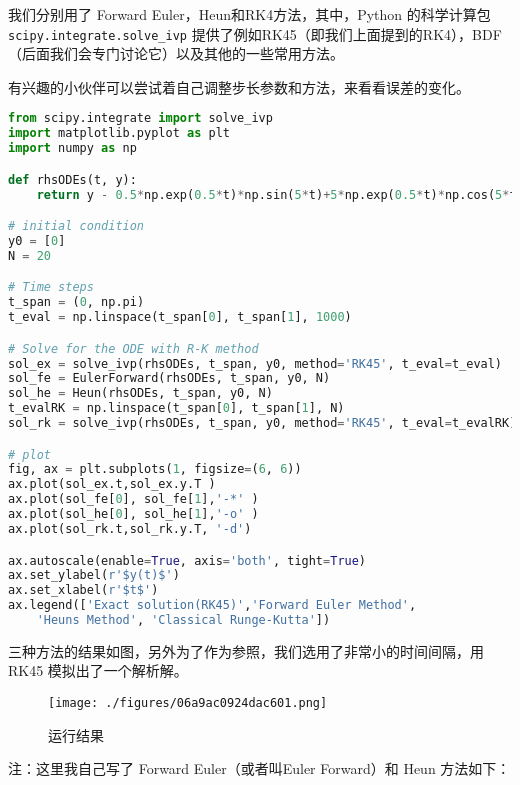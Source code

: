 我们分别用了 Forward Euler，Heun和RK4方法，其中，Python 的科学计算包 \verb|scipy.integrate.solve_ivp| 提供了例如RK45（即我们上面提到的RK4），BDF（后面我们会专门讨论它）以及其他的一些常用方法。

有兴趣的小伙伴可以尝试着自己调整步长参数和方法，来看看误差的变化。
\begin{lstlisting}[language=python]
from scipy.integrate import solve_ivp
import matplotlib.pyplot as plt
import numpy as np

def rhsODEs(t, y):
    return y - 0.5*np.exp(0.5*t)*np.sin(5*t)+5*np.exp(0.5*t)*np.cos(5*t)

# initial condition
y0 = [0]
N = 20

# Time steps
t_span = (0, np.pi)
t_eval = np.linspace(t_span[0], t_span[1], 1000)

# Solve for the ODE with R-K method
sol_ex = solve_ivp(rhsODEs, t_span, y0, method='RK45', t_eval=t_eval)
sol_fe = EulerForward(rhsODEs, t_span, y0, N)
sol_he = Heun(rhsODEs, t_span, y0, N)
t_evalRK = np.linspace(t_span[0], t_span[1], N)
sol_rk = solve_ivp(rhsODEs, t_span, y0, method='RK45', t_eval=t_evalRK)

# plot
fig, ax = plt.subplots(1, figsize=(6, 6))
ax.plot(sol_ex.t,sol_ex.y.T )
ax.plot(sol_fe[0], sol_fe[1],'-*' )
ax.plot(sol_he[0], sol_he[1],'-o' )
ax.plot(sol_rk.t,sol_rk.y.T, '-d')

ax.autoscale(enable=True, axis='both', tight=True)
ax.set_ylabel(r'$y(t)$')
ax.set_xlabel(r'$t$')
ax.legend(['Exact solution(RK45)','Forward Euler Method',
    'Heuns Method', 'Classical Runge-Kutta'])
\end{lstlisting}

三种方法的结果如图，另外为了作为参照，我们选用了非常小的时间间隔，用 RK45 模拟出了一个解析解。

\begin{figure}[ht]
\centering
\texttt{[image: ./figures/06a9ac0924dac601.png]}
\caption{运行结果} \label{fig_NordEq_4}
\end{figure}

注：这里我自己写了 Forward Euler（或者叫Euler Forward）和 Heun 方法如下：

